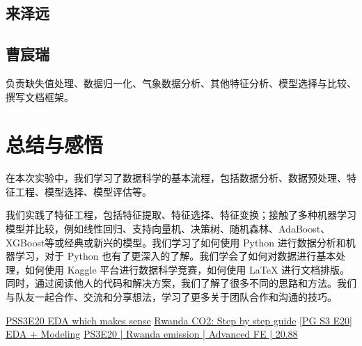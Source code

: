 \documentclass{ctexart}
\begin{document}
\subsection{来泽远}

\subsection{曹宸瑞}

负责缺失值处理、数据归一化、气象数据分析、其他特征分析、模型选择与比较、撰写文档框架。

\section{总结与感悟}

在本次实验中，我们学习了数据科学的基本流程，包括数据分析、数据预处理、特征工程、模型选择、模型评估等。

我们实践了特征工程，包括特征提取、特征选择、特征变换；接触了多种机器学习模型并比较，例如线性回归、支持向量机、决策树、随机森林、AdaBoost、XGBoost等或经典或新兴的模型。我们学习了如何使用 Python 进行数据分析和机器学习，对于 Python 也有了更深入的了解。我们学会了如何对数据进行基本处理，如何使用 Kaggle 平台进行数据科学竞赛，如何使用 \LaTeX{} 进行文档排版。同时，通过阅读他人的代码和解决方案，我们了解了很多不同的思路和方法。我们与队友一起合作、交流和分享想法，学习了更多关于团队合作和沟通的技巧。

\begin{thebibliography}{100}
\href{https://www.kaggle.com/code/ambrosm/pss3e20-eda-which-makes-sense}{PSS3E20 EDA which makes sense}
\href{https://www.kaggle.com/code/kacperrabczewski/rwanda-co2-step-by-step-guide}{Rwanda CO2: Step by step guide}
\href{https://www.kaggle.com/code/yaaangzhou/pg-s3-e20-eda-modeling}{[PG S3 E20] EDA + Modeling}
\href{https://www.kaggle.com/code/dmitryuarov/ps3e20-rwanda-emission-advanced-fe-20-88}{PS3E20 | Rwanda emission | Advanced FE | 20.88}
\end{thebibliography}
\end{document}
